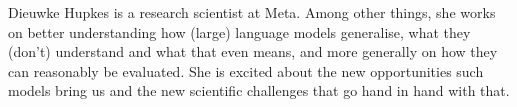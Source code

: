 Dieuwke Hupkes is a research scientist at Meta. Among other things, she works on better understanding how (large) language models generalise, what they (don't) understand and what that even means, and more generally on how they can reasonably be evaluated. She is excited about the new opportunities such models bring us and the new scientific challenges that go hand in hand with that.